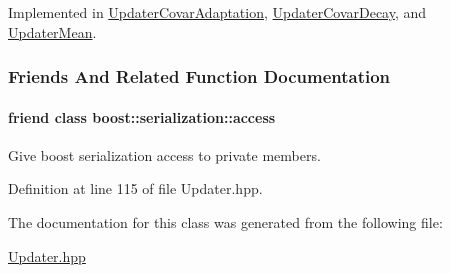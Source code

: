 Implemented in \hyperlink{classDmpBbo_1_1UpdaterCovarAdaptation_aabb65aaf08049416ed18b294d5fca415}{Updater\+Covar\+Adaptation}, \hyperlink{classDmpBbo_1_1UpdaterCovarDecay_aabb65aaf08049416ed18b294d5fca415}{Updater\+Covar\+Decay}, and \hyperlink{classDmpBbo_1_1UpdaterMean_aabb65aaf08049416ed18b294d5fca415}{Updater\+Mean}.



\subsubsection{Friends And Related Function Documentation}
\hypertarget{classDmpBbo_1_1Updater_ac98d07dd8f7b70e16ccb9a01abf56b9c}{
\paragraph[{boost\+::serialization\+::access}]{\setlength{\rightskip}{0pt plus 5cm}friend class boost\+::serialization\+::access\hspace{0.3cm}{\ttfamily [friend]}}}\label{classDmpBbo_1_1Updater_ac98d07dd8f7b70e16ccb9a01abf56b9c}


Give boost serialization access to private members. 



Definition at line 115 of file Updater.\+hpp.



The documentation for this class was generated from the following file\+:\begin{DoxyCompactItemize}
\item 
\hyperlink{Updater_8hpp}{Updater.\+hpp}\end{DoxyCompactItemize}
